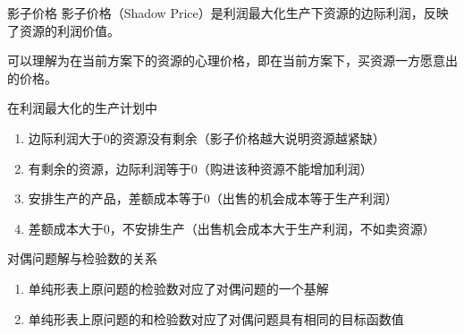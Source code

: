 \documentclass[12pt, a4paper, oneside, UTF8]{ctexbook}
\begin{document}
\begin{definition}
    影子价格
影子价格（Shadow Price）是利润最大化生产下资源的边际利润，反映了资源的利润价值。

可以理解为在当前方案下的资源的心理价格，即在当前方案下，买资源一方愿意出的价格。
\end{definition}

在利润最大化的生产计划中
\begin{enumerate}
    \item 边际利润大于0的资源没有剩余（影子价格越大说明资源越紧缺）
    \item 有剩余的资源，边际利润等于0（购进该种资源不能增加利润）
    \item 安排生产的产品，差额成本等于0（出售的机会成本等于生产利润）
    \item 差额成本大于0，不安排生产（出售机会成本大于生产利润，不如卖资源）
\end{enumerate}

\begin{remark}
    对偶问题解与检验数的关系
    \begin{enumerate}
        \item 单纯形表上原问题的检验数对应了对偶问题的一个基解
        \item 单纯形表上原问题的和检验数对应了对偶问题具有相同的目标函数值
    \end{enumerate}
\end{remark}



\ifx\allfiles\undefined
\end{document}
